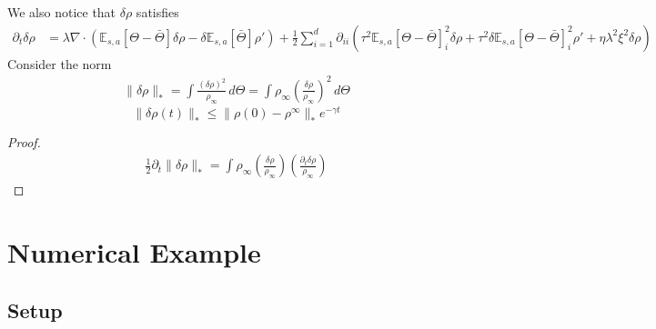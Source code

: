 \documentclass[10.5pt]{article}
\newcommand\bb{\mathbb}
\newtheorem{theorem}{Theorem}
\begin{document}
\color{blue}

We also notice that $\delta\rho$ satisfies
\begin{align*}
  \partial_t \delta \rho &=
  \lambda \nabla \cdot (\bb E_{s,a}[\Theta - \bar \Theta]\delta  \rho - \delta \bb E_{s,a}[\bar \Theta]  \rho')
  + \frac{1}{2} \sum_{i=1}^d\partial_{ii}(\tau^2\bb E_{s,a}[\Theta - \bar \Theta] _{i}^2 \delta \rho + \tau^2 \delta \bb E_{s,a}[\Theta - \bar \Theta]_{i}^2 \rho' + \eta \lambda^2 \xi^2 \delta \rho )
\end{align*}
Consider the norm
\begin{align*}
  \|\delta \rho\|_* = \int \frac{(\delta \rho)^2}{\rho_\infty}\, d\Theta = \int \rho_\infty \left(\frac{\delta \rho}{\rho_\infty} \right)^2\, d\Theta 
\end{align*}
\color{red}
$$
\| \delta \rho(t)\|_* \leq \|\rho(0) - \rho^\infty\|_* e^{-\gamma t}
$$

\begin{proof}
  \begin{align*}
    \tfrac{1}{2}\partial_t \|\delta \rho\|_* = \int \rho_\infty \left(\frac{\delta \rho}{\rho_\infty} \right)\left(\frac{\partial_t \delta \rho}{\rho_\infty} \right)
  \end{align*}
\end{proof}
\color{black}
\section{Numerical Example}
\subsection{Setup}
\end{document}
